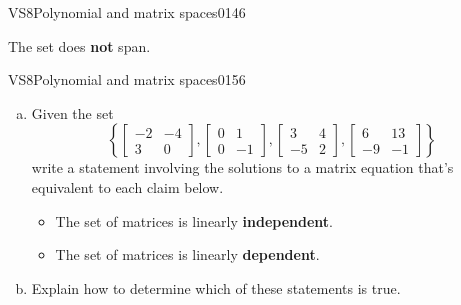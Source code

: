 \begin{exercise}{VS8}{Polynomial and matrix spaces}{0146}
\begin{exerciseAnswer}
 

 The set does \textbf{not} span. 

 \end{exerciseAnswer}
 \end{exercise}



\begin{exercise}{VS8}{Polynomial and matrix spaces}{0156} 
\begin{exerciseStatement} 

\begin{enumerate}[(a)]
\item  

 Given the set \[\left\{ \left[\begin{array}{cc}
-2 & -4 \\
3 & 0
\end{array}\right] , \left[\begin{array}{cc}
0 & 1 \\
0 & -1
\end{array}\right] , \left[\begin{array}{cc}
3 & 4 \\
-5 & 2
\end{array}\right] , \left[\begin{array}{cc}
6 & 13 \\
-9 & -1
\end{array}\right] \right\}\] write a statement involving the solutions to a matrix equation that's equivalent to each claim below. 

 

\begin{itemize}
\item  

 The set of matrices is linearly \textbf{independent}. 

 
\item  

 The set of matrices is linearly \textbf{dependent}. 

 
\end{itemize}

     
\item  

 Explain how to determine which of these statements is true. 

 
\end{enumerate}

     \end{exerciseStatement}
 \begin{exerciseAnswer} 


\end{exerciseAnswer}
\end{exercise}
